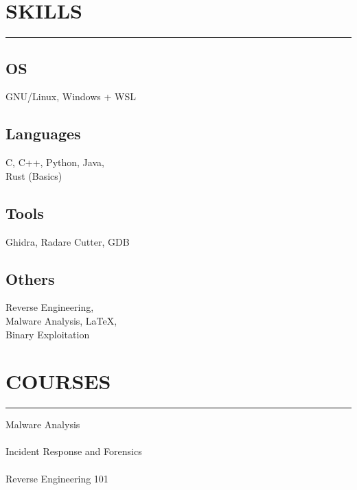 \documentclass[]{resume}
\begin{document}
\begin{minipage}[t]{0.33\textwidth}

    \section{SKILLS}
    \noindent\rule{5cm}{0.4pt}

    \subsection{OS}
    \noindent GNU/Linux, Windows + WSL

    \vspace{6pt}
    \subsection{Languages}
    \noindent C, C++, Python, Java,\\
    Rust (Basics)

    \vspace{6pt}
    \subsection{Tools}
    \noindent Ghidra, Radare Cutter, GDB

    \vspace{6pt}
    \subsection{Others}
    \noindent Reverse Engineering,\\
    Malware Analysis, LaTeX,\\
    Binary Exploitation


    \section{COURSES}
    \noindent\rule{5cm}{0.4pt}

    \noindent Malware Analysis\\
    \noindent {}\\

    \vspace{6pt}
    \noindent Incident Response and Forensics\\
    \noindent {}\\

    \vspace{6pt}
    \noindent Reverse Engineering 101\\
    \noindent {}\\

\end{minipage}
\end{document}
